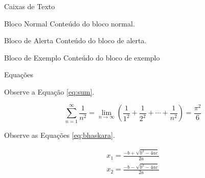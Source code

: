 \documentclass{beamer}
\begin{document}
\begin{frame}{Caixas de Texto}

\begin{block}{Bloco Normal}
Conteúdo do bloco normal.
\end{block}

\begin{alertblock}{Bloco de Alerta}
Conteúdo do bloco de alerta.
\end{alertblock}

\begin{exampleblock}{Bloco de Exemplo}
Conteúdo do bloco de exemplo
\end{exampleblock}

\end{frame}


\begin{frame}{Equações}

Observe a Equação \ref{eq:sum}.

\begin{equation}\label{eq:sum}
\sum_{n=1}^\infty \frac{1}{n^2} = \lim_{n \to \infty} \left( \frac{1}{1^2} + \frac{1}{2^2} + \cdots + \frac{1}{n^2} \right) = \frac{\pi^2}{6}
\end{equation}

Observe as Equações \ref{eq:bhaskara}.

\begin{equation}\label{eq:bhaskara}
\begin{split}
x_1 = \frac{-b + \sqrt{b^2 - 4ac}}{2a} \\
x_2 = \frac{-b - \sqrt{b^2 - 4ac}}{2a}
\end{split}
\end{equation}

\end{frame}


\end{document}
